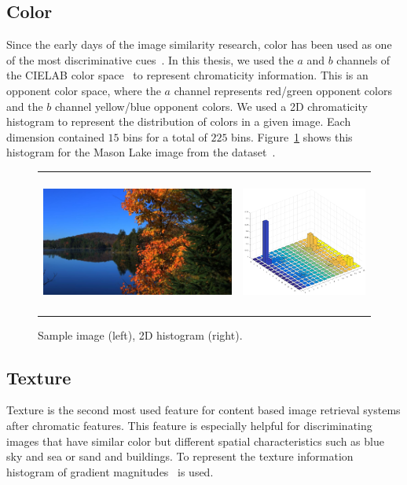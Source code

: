 \subsection{Color}
Since the early days of the image similarity research, color has been used as one of the most discriminative cues~\cite{neumann2006image}. In this thesis,  we used the $a$ and $b$ channels of the CIELAB color space~\cite{iso201111664} to represent chromaticity information. This is an opponent color space, where the $a$ channel represents red/green opponent colors and the $b$ channel yellow/blue opponent colors. We used a 2D chromaticity histogram to represent the distribution of colors in a given image. Each dimension contained $15$ bins for a total of $225$ bins.  Figure~\ref{fig:hists} shows this histogram for the Mason Lake image from the
dataset~\cite{fairchild2007hdr}.

\begin{figure}
\centering
\caption{Sample image (left), 2D histogram (right).}
\label{fig:hists}
\begin{tabular}{c c}
\includegraphics[height=1.8in]{figures/chapter2/MasonLake.jpg} &
\includegraphics[height=1.8in]{figures/chapter2/57_histab.png}

\end{tabular}
\end{figure}

\subsection{Texture}
Texture is the second most used feature for content based image retrieval systems after chromatic features.  This feature is especially helpful for discriminating images that have similar color but different spatial characteristics such as blue sky and sea or sand and buildings. To represent the texture information histogram of gradient magnitudes~\cite{sharma2015histogram} is used. 
